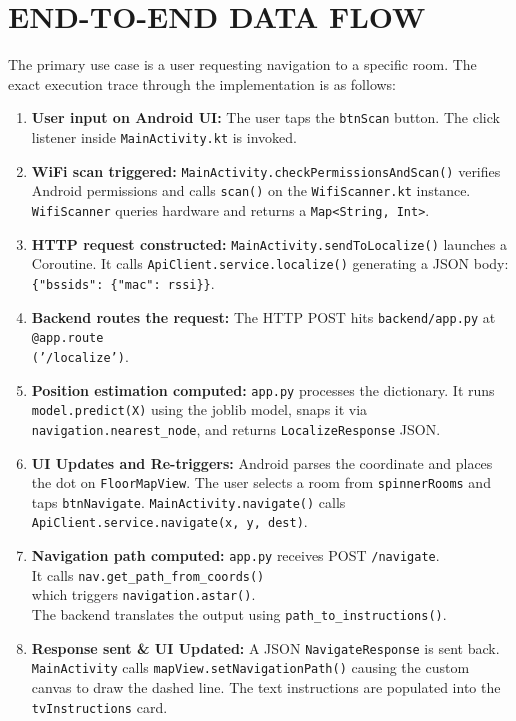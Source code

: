 \documentclass[11pt,a4paper]{article}
\begin{document}
\section{END-TO-END DATA FLOW}
The primary use case is a user requesting navigation to a specific room. The exact execution trace through the implementation is as follows:
\begin{enumerate}
\item \textbf{User input on Android UI:} The user taps the \texttt{btnScan} button. The click listener inside \texttt{MainActivity.kt} is invoked.
\item \textbf{WiFi scan triggered:} \texttt{MainActivity.checkPermissionsAndScan()} verifies Android permissions and calls \texttt{scan()} on the \texttt{WifiScanner.kt} instance. \texttt{WifiScanner} queries hardware and returns a \texttt{Map<String, Int>}.
\item \textbf{HTTP request constructed:} \texttt{MainActivity.sendToLocalize()} launches a Coroutine. It calls \texttt{ApiClient.service.localize()} generating a JSON body: \texttt{\{"bssids": \{"mac": rssi\}\}}.
\item \textbf{Backend routes the request:} The HTTP POST hits \texttt{backend/app.py} at \texttt{@app.route \\ ('/localize')}.
\item \textbf{Position estimation computed:} \texttt{app.py} processes the dictionary. It runs \texttt{model.predict(X)} using the joblib model, snaps it via \texttt{navigation.nearest\_node}, and returns \texttt{LocalizeResponse} JSON.
\item \textbf{UI Updates and Re-triggers:} Android parses the coordinate and places the dot on \texttt{FloorMapView}. The user selects a room from \texttt{spinnerRooms} and taps \texttt{btnNavigate}. \texttt{MainActivity.navigate()} calls \texttt{ApiClient.service.navigate(x, y, dest)}.
\item \textbf{Navigation path computed:} \texttt{app.py} receives POST \texttt{/navigate}. \\ It calls \texttt{nav.get\_path\_from\_coords()} \\ which triggers \texttt{navigation.astar()}. \\ The backend translates the output using \texttt{path\_to\_instructions()}.
\item \textbf{Response sent \& UI Updated:} A JSON \texttt{NavigateResponse} is sent back. \texttt{MainActivity} calls \texttt{mapView.setNavigationPath()} causing the custom canvas to draw the dashed line. The text instructions are populated into the \texttt{tvInstructions} card.
\end{enumerate}
\end{document}
